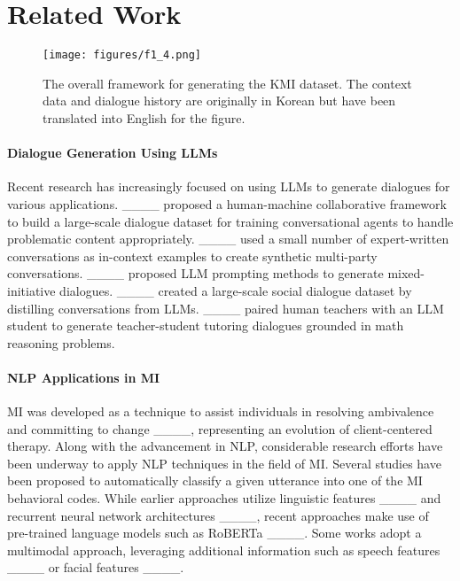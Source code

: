 \section{Related Work}
\label{sec:related_work}

\begin{figure*}[htb!]
    \centering 
    \texttt{[image: figures/f1\_4.png]}
    \caption{The overall framework for generating the KMI dataset. The context data and dialogue history are originally in Korean but have been translated into English for the figure.} 
    \label{fig:framework}
\end{figure*}


\paragraph{Dialogue Generation Using LLMs}
Recent research has increasingly focused on using LLMs to generate dialogues for various applications.
____ proposed a human-machine collaborative framework to build a large-scale dialogue dataset for training conversational agents to handle problematic content appropriately.
____ used a small number of expert-written conversations as in-context examples to create synthetic multi-party conversations.
____ proposed LLM prompting methods to generate mixed-initiative dialogues.
____ created a large-scale social dialogue dataset by distilling conversations from LLMs.
____ paired human teachers with an LLM student to generate teacher-student tutoring dialogues grounded in math reasoning problems.



\paragraph{NLP Applications in MI}
MI was developed as a technique to assist individuals in resolving ambivalence and committing to change ____, representing an evolution of client-centered therapy. 
Along with the advancement in NLP, considerable research efforts have been underway to apply NLP techniques in the field of MI. 
Several studies have been proposed to automatically classify a given utterance into one of the MI behavioral codes.
While earlier approaches utilize linguistic features ____ and recurrent neural network architectures ____, recent approaches make use of pre-trained language models such as RoBERTa ____. 
Some works adopt a multimodal approach, leveraging additional information such as speech features ____ or facial features ____.



